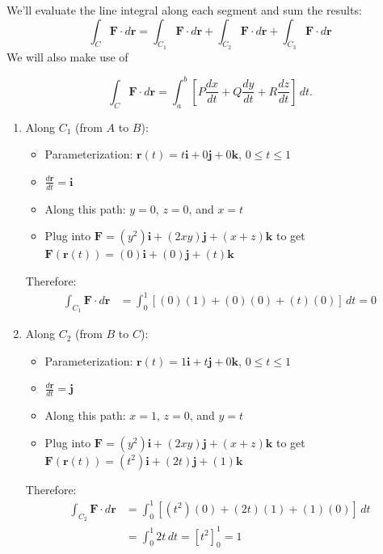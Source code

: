 \begin{example}
\begin{solution} We'll evaluate the line integral along each segment and sum the results:
\[
\int_C \mathbf{F}\cdot d\mathbf{r} = \int_{C_1} \mathbf{F}\cdot d\mathbf{r} + \int_{C_2} \mathbf{F}\cdot d\mathbf{r} + \int_{C_3} \mathbf{F}\cdot d\mathbf{r}
\]
\noindent We will also make use of 

\[
\int_C \mathbf{F} \cdot d\mathbf{r} =  \int_a^b \left[P\frac{dx}{dt} + Q\frac{dy}{dt} + R\frac{dz}{dt}\right]\,dt.
\]

\begin{enumerate}

\item Along $C_1$ (from $A$ to $B$):
\begin{itemize}
    \item Parameterization: $\mathbf{r}(t) = t\mathbf{i} + 0\mathbf{j} + 0\mathbf{k}$, $0 \leq t \leq 1$
    \item $\frac{d\mathbf{r}}{dt} = \mathbf{i}$
    \item Along this path: $y=0$, $z=0$, and $x=t$
    \item Plug into $\mathbf{F} = (y^2)\mathbf{i} + (2xy)\mathbf{j} + (x+z)\mathbf{k}$ to get $\mathbf{F}(\mathbf{r}(t)) = (0)\mathbf{i} + (0)\mathbf{j} + (t)\mathbf{k}$
\end{itemize}
Therefore:
\begin{align*}
\int_{C_1} \mathbf{F}\cdot d\mathbf{r} &= \int_0^1 [(0)(1) + (0)(0) + (t)(0)]\,dt = 0
\end{align*}

\item Along $C_2$ (from $B$ to $C$):
\begin{itemize}
    \item Parameterization: $\mathbf{r}(t) = 1\mathbf{i} + t\mathbf{j} + 0\mathbf{k}$, $0 \leq t \leq 1$
    \item $\frac{d\mathbf{r}}{dt} = \mathbf{j}$
    \item Along this path: $x=1$, $z=0$, and $y=t$
    \item Plug into $\mathbf{F} = (y^2)\mathbf{i} + (2xy)\mathbf{j} + (x+z)\mathbf{k}$ to get $\mathbf{F}(\mathbf{r}(t)) = (t^2)\mathbf{i} + (2t)\mathbf{j} + (1)\mathbf{k}$
\end{itemize}
Therefore:
\begin{align*}
\int_{C_2} \mathbf{F}\cdot d\mathbf{r} &= \int_0^1 [(t^2)(0) + (2t)(1) + (1)(0)]\,dt \\
&= \int_0^1 2t\,dt = [t^2]_0^1 = 1
\end{align*}


\end{enumerate}
\end{solution}
\end{example}
